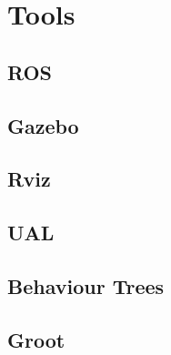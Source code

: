 \section{Tools}
\label{sec:PreviousStudy}

\subsection{ROS}
\label{subsec:ROS}

\subsection{Gazebo}
\label{subsec:Gazebo}

\subsection{Rviz}
\label{subsec:Rviz}

\subsection{UAL}
\label{subsec:UAL}

\subsection{Behaviour Trees}
\label{subsec:BehaviourTrees}

\subsection{Groot}
\label{subsec:Groot}



\endinput

